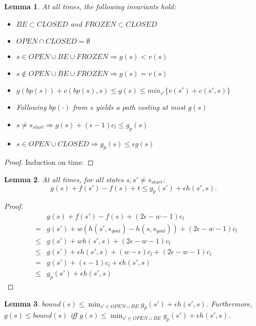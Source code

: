 \documentclass[letterpaper]{article}
\newtheorem{lemma}{Lemma}
\begin{document}
\begin{lemma}
\label{lem:prop}
At all times, the following invariants hold:
\begin{itemize}
\item $BE\subset CLOSED$ and $FROZEN\subset CLOSED$
\item $OPEN\cap CLOSED = \emptyset$
\item $s\in OPEN\cup BE\cup FROZEN \Rightarrow g(s) < v(s)$
\item $s\notin OPEN\cup BE\cup FROZEN \Rightarrow g(s) = v(s)$
\item $g(bp(s)) + c(bp(s),s) \le g(s) \le min_{s'}\{v(s') + c(s',s)\}$
\item Following $bp(\cdot)$ from $s$ yields a path costing at most $g(s)$
\item $s\ne s_{start} \Rightarrow g(s) + (\epsilon-1)c_l \le g_p(s)$
\item $s\in OPEN\cup CLOSED \Rightarrow g_p(s) \le \epsilon g(s)$
\end{itemize}
\end{lemma}

\begin{proof}
Induction on time.
\end{proof}

\begin{lemma}
\label{lem:indep}
At all times, for all states $s,s' \ne s_{start}$:
\[g(s) + f(s') - f(s) + t \le g_p(s') + \epsilon h(s',s).\]
\end{lemma}

\begin{proof}
\begin{eqnarray*}
&&g(s) + f(s') - f(s) + (2\epsilon-w-1)c_l
\\&=& g(s') + w(h(s',s_{goal}) - h(s,s_{goal})) + (2\epsilon-w-1)c_l
\\&\le& g(s') + wh(s',s) + (2\epsilon-w-1)c_l
\\&\le& g(s') + \epsilon h(s',s) + (w-\epsilon)c_l + (2\epsilon-w-1)c_l
\\&=& g(s') + (\epsilon-1)c_l + \epsilon h(s',s)
\\&\le& g_p(s') + \epsilon h(s',s)
\end{eqnarray*}
\end{proof}

\begin{lemma}
\label{lem:bound}
$bound(s) \le \min_{s'\in OPEN \cup BE} g_p(s') + \epsilon h(s',s)$. Furthermore, $g(s) \le bound(s)$ iff $g(s) \le \min_{s'\in OPEN \cup BE} g_p(s') + \epsilon h(s',s)$.
\end{lemma}
\end{document}
